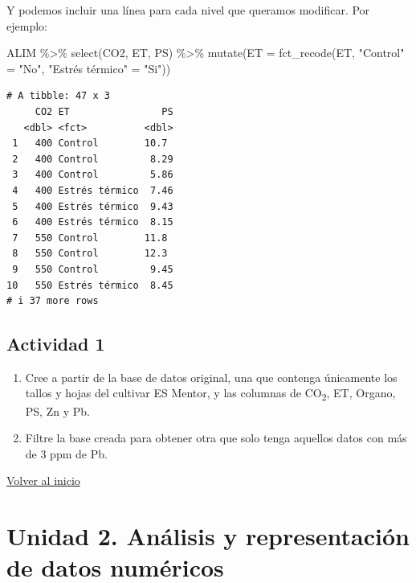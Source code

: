 \documentclass[
  letterpaper,
  DIV=11,
  numbers=noendperiod]{scrartcl}
\newenvironment{Shaded}{\begin{snugshade}}{\end{snugshade}}
\newcommand{\AttributeTok}[1]{\textcolor[rgb]{0.40,0.45,0.13}{#1}}
\newcommand{\FunctionTok}[1]{\textcolor[rgb]{0.28,0.35,0.67}{#1}}
\newcommand{\NormalTok}[1]{\textcolor[rgb]{0.00,0.23,0.31}{#1}}
\newcommand{\OtherTok}[1]{\textcolor[rgb]{0.00,0.23,0.31}{#1}}
\newcommand{\SpecialCharTok}[1]{\textcolor[rgb]{0.37,0.37,0.37}{#1}}
\newcommand{\StringTok}[1]{\textcolor[rgb]{0.13,0.47,0.30}{#1}}
\providecommand{\tightlist}{%
  \setlength{\itemsep}{0pt}\setlength{\parskip}{0pt}}\usepackage{longtable,booktabs,array}
\begin{document}
Y podemos incluir una línea para cada nivel que queramos modificar. Por
ejemplo:

\begin{Shaded}
\begin{Highlighting}[]
\NormalTok{ALIM }\SpecialCharTok{\%\textgreater{}\%} \FunctionTok{select}\NormalTok{(CO2, ET, PS) }\SpecialCharTok{\%\textgreater{}\%}
  \FunctionTok{mutate}\NormalTok{(}\AttributeTok{ET =} \FunctionTok{fct\_recode}\NormalTok{(ET,}
                         \StringTok{"Control"}  \OtherTok{=} \StringTok{"No"}\NormalTok{,}
                         \StringTok{"Estrés térmico"} \OtherTok{=} \StringTok{"Si"}\NormalTok{)) }
\end{Highlighting}
\end{Shaded}

\begin{verbatim}
# A tibble: 47 x 3
     CO2 ET                PS
   <dbl> <fct>          <dbl>
 1   400 Control        10.7 
 2   400 Control         8.29
 3   400 Control         5.86
 4   400 Estrés térmico  7.46
 5   400 Estrés térmico  9.43
 6   400 Estrés térmico  8.15
 7   550 Control        11.8 
 8   550 Control        12.3 
 9   550 Control         9.45
10   550 Estrés térmico  8.45
# i 37 more rows
\end{verbatim}

\hypertarget{actividad-1}{%
\subsection{Actividad 1}\label{actividad-1}}

\begin{enumerate}
\def\labelenumi{\arabic{enumi}.}
\tightlist
\item
  Cree a partir de la base de datos original, una que contenga
  únicamente los tallos y hojas del cultivar ES Mentor, y las columnas
  de CO\textsubscript{2}, ET, Organo, PS, Zn y Pb.
\item
  Filtre la base creada para obtener otra que solo tenga aquellos datos
  con más de 3 ppm de Pb.
\end{enumerate}

\href{../}{Volver al inicio}

\hypertarget{unidad-2.-anuxe1lisis-y-representaciuxf3n-de-datos-numuxe9ricos}{%
\section{Unidad 2. Análisis y representación de datos
numéricos}\label{unidad-2.-anuxe1lisis-y-representaciuxf3n-de-datos-numuxe9ricos}}
\end{document}
